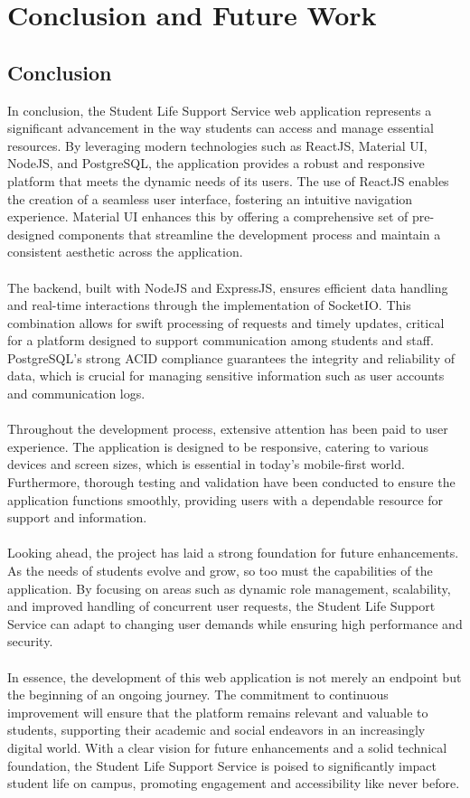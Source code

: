 \section{Conclusion and Future Work}


\subsection{Conclusion}

In conclusion, the Student Life Support Service web application represents a significant advancement in the way students can access and manage essential resources. By leveraging modern technologies such as ReactJS, Material UI, NodeJS, and PostgreSQL, the application provides a robust and responsive platform that meets the dynamic needs of its users. The use of ReactJS enables the creation of a seamless user interface, fostering an intuitive navigation experience. Material UI enhances this by offering a comprehensive set of pre-designed components that streamline the development process and maintain a consistent aesthetic across the application. \\ \\
The backend, built with NodeJS and ExpressJS, ensures efficient data handling and real-time interactions through the implementation of SocketIO. This combination allows for swift processing of requests and timely updates, critical for a platform designed to support communication among students and staff. PostgreSQL's strong ACID compliance guarantees the integrity and reliability of data, which is crucial for managing sensitive information such as user accounts and communication logs. \\ \\
Throughout the development process, extensive attention has been paid to user experience. The application is designed to be responsive, catering to various devices and screen sizes, which is essential in today’s mobile-first world. Furthermore, thorough testing and validation have been conducted to ensure the application functions smoothly, providing users with a dependable resource for support and information. \\ \\
Looking ahead, the project has laid a strong foundation for future enhancements. As the needs of students evolve and grow, so too must the capabilities of the application. By focusing on areas such as dynamic role management, scalability, and improved handling of concurrent user requests, the Student Life Support Service can adapt to changing user demands while ensuring high performance and security. \\ \\
In essence, the development of this web application is not merely an endpoint but the beginning of an ongoing journey. The commitment to continuous improvement will ensure that the platform remains relevant and valuable to students, supporting their academic and social endeavors in an increasingly digital world. With a clear vision for future enhancements and a solid technical foundation, the Student Life Support Service is poised to significantly impact student life on campus, promoting engagement and accessibility like never before.

